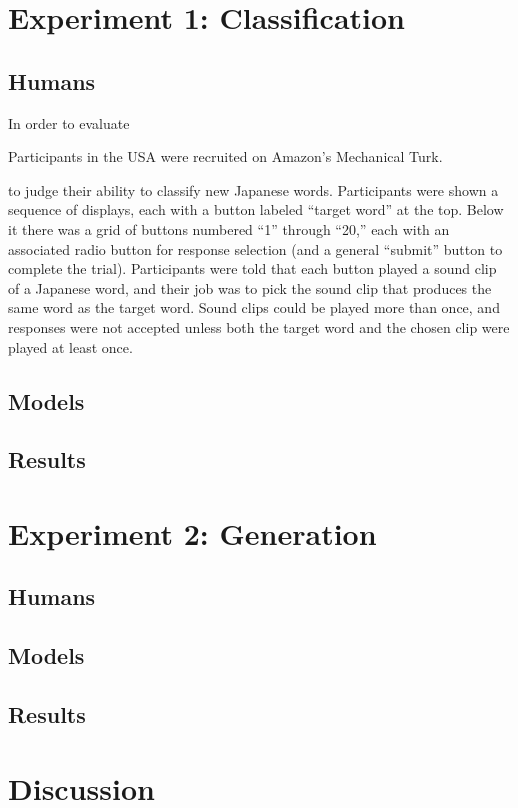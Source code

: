 \documentclass[10pt,letterpaper]{article}
\begin{document}
\section{Experiment 1: Classification}

\subsection{Humans}
In order to evaluate 

Participants in the USA were recruited on Amazon's Mechanical Turk. 

 to judge their ability to classify new Japanese words. Participants were shown a sequence of displays, each with a button labeled ``target word'' at the top. Below it there was a grid of buttons numbered ``1'' through ``20,'' each with an associated radio button for response selection (and a general ``submit'' button to complete the trial). Participants were told that each button played a sound clip of a Japanese word, and their job was to pick the sound clip that produces the same word as the target word. Sound clips could be played more than once, and responses were not accepted unless both the target word and the chosen clip were played at least once. 


\subsection{Models}

\subsection{Results}

\section{Experiment 2: Generation}

\subsection{Humans}

\subsection{Models}

\subsection{Results}

\section{Discussion}


\setlength{\bibleftmargin}{.125in}
\setlength{\bibindent}{-\bibleftmargin}


\end{document}
